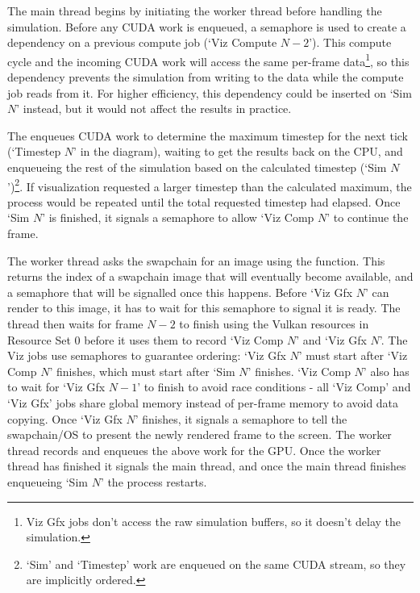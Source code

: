 The main thread begins by initiating the worker thread before handling the simulation.
Before any CUDA work is enqueued, a semaphore is used to create a dependency on a previous compute job (`Viz Compute $N - 2$'). %
This compute cycle and the incoming CUDA work will access the same per-frame data\footnote{Viz Gfx jobs don't access the raw simulation buffers, so it doesn't delay the simulation.}, so this dependency prevents the simulation from writing to the data while the compute job reads from it.
For higher efficiency, this dependency could be inserted on `Sim $N$' instead, but it would not affect the results in practice.

The  enqueues CUDA work to determine the maximum timestep for the next tick (`Timestep $N$' in the diagram), waiting to get the results back on the CPU, and enqueueing the rest of the simulation based on the calculated timestep (`Sim $N$')\footnote{`Sim' and `Timestep' work are enqueued on the same CUDA stream, so they are implicitly ordered.}.%
If visualization requested a larger timestep than the calculated maximum, the process would be repeated until the total requested timestep had elapsed.
Once `Sim $N$' is finished, it signals a semaphore to allow `Viz Comp $N$' to continue the frame. %

The worker thread asks the swapchain for an image using the  function.
This returns the index of a swapchain image that will eventually become available, and a semaphore that will be signalled once this happens.
Before `Viz Gfx $N$' can render to this image, it has to wait for this semaphore to signal it is ready. %
The thread then waits for frame $N-2$ to finish using the Vulkan resources in Resource Set 0 before it uses them to record `Viz Comp $N$' and `Viz Gfx $N$'. %
The Viz jobs use semaphores to guarantee ordering:
`Viz Gfx $N$' must start after `Viz Comp $N$' finishes, which must start after `Sim $N$' finishes. %
`Viz Comp $N$' also has to wait for `Viz Gfx $N - 1$' to finish to avoid race conditions - all `Viz Comp' and `Viz Gfx' jobs share global memory instead of per-frame memory to avoid data copying. %
Once `Viz Gfx $N$' finishes, it signals a semaphore to tell the swapchain/OS to present the newly rendered frame to the screen.
The worker thread records and enqueues the above work for the GPU.
Once the worker thread has finished it signals the main thread, and once the main thread finishes enqueueing `Sim $N$' the process restarts.

